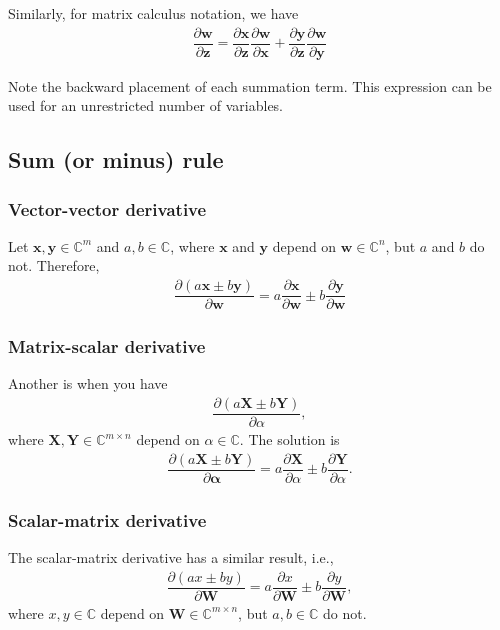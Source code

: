 \documentclass{article}
\begin{document}
Similarly, for matrix calculus notation, we have
\begin{align}
    \label{eq:chain-multi-inter}
    \dfrac{\partial \mathbf{w}}{\partial \mathbf{z}} = \dfrac{\partial \mathbf{x}}{\partial \mathbf{z}} \dfrac{\partial \mathbf{w}}{\partial \mathbf{x}} + \dfrac{\partial \mathbf{y}}{\partial \mathbf{z}} \dfrac{\partial \mathbf{w}}{\partial \mathbf{y}}
\end{align}

Note the backward placement of each summation term. This expression can be used for an unrestricted number of variables.

\subsection{Sum (or minus) rule}
\subsubsection{Vector-vector derivative}
Let \(\mathbf{x}, \mathbf{y} \in \mathbb{C}^{m}\) and \(a, b \in \mathbb{C}\), where \(\mathbf{x}\) and \(\mathbf{y}\) depend on \(\mathbf{w} \in \mathbb{C}^{n}\), but \(a\) and \(b\) do not. Therefore,
\begin{align}
    \dfrac{\partial (a\mathbf{x} \pm b\mathbf{y})}{\partial\mathbf{w}} = a\dfrac{\partial \mathbf{x}}{\partial\mathbf{w}} \pm b\dfrac{\partial \mathbf{y}}{\partial\mathbf{w}}
\end{align}
\subsubsection{Matrix-scalar derivative}
Another is when you have
\begin{align}
    \dfrac{\partial \left( a\mathbf{X} \pm b\mathbf{Y} \right)}{\partial \alpha},
\end{align}
where \(\mathbf{X}, \mathbf{Y} \in \mathbb{C}^{m \times n}\) depend on \(\alpha \in \mathbb{C}\). The solution is
\begin{align}
    \dfrac{\partial (a\mathbf{X} \pm b\mathbf{Y})}{\partial\mathbf{\alpha}} = a\dfrac{\partial \mathbf{X}}{\partial \alpha} \pm b \dfrac{\partial \mathbf{Y}}{\partial \alpha}.
\end{align}
\subsubsection{Scalar-matrix derivative}
The scalar-matrix derivative has a similar result, i.e.,
\begin{align}
    \dfrac{\partial \left( ax \pm by \right)}{\partial \mathbf{W}} = a\dfrac{\partial x}{\partial \mathbf{W}} \pm b \dfrac{\partial y}{\partial \mathbf{W}},
\end{align}
where \(x, y \in \mathbb{C}\) depend on \(\mathbf{W} \in \mathbb{C}^{m\times n}\), but \(a,b \in \mathbb{C}\) do not.
\end{document}
